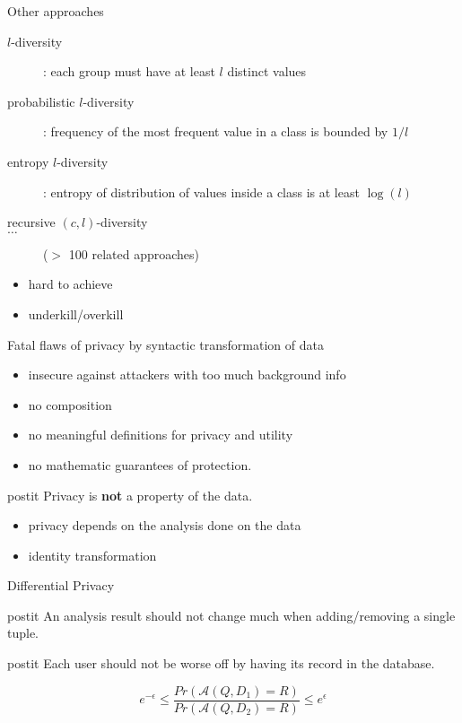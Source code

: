 \documentclass{beamer}
\begin{document}
\begin{frame}{Other approaches}
  \begin{description}
    \item[$l$-diversity]: each group must have at least $l$ distinct values
    \item[probabilistic $l$-diversity]: frequency of the most frequent value
      in a class is bounded by $1/l$
    \item[entropy $l$-diversity]: entropy of distribution of values inside a
      class is at least $\log(l)$
    \item[recursive $(c, l)$-diversity]
    \item[$\ldots$] ($>$ 100 related approaches)
  \end{description}
  \pause
  \begin{itemize}
    \item hard to achieve
    \item underkill/overkill
  \end{itemize}
\end{frame}

\begin{frame}{Fatal flaws of privacy by syntactic transformation of data}
  \begin{itemize}
    \item insecure against attackers with too much background info
    \item no composition
    \item no meaningful definitions for privacy and utility
    \item no mathematic guarantees of protection.
  \end{itemize}
  \pause
  \begin{beamercolorbox}[wd=\textwidth,rounded=true,shadow=true]{postit}
    Privacy is \textbf{not} a property of the data.
  \end{beamercolorbox}
  \begin{itemize}
    \item privacy depends on the analysis done on the data
    \item identity transformation
  \end{itemize}
\end{frame}

\begin{frame}{Differential Privacy}
  \begin{beamercolorbox}[wd=\textwidth,rounded=true,shadow=true]{postit}
    An analysis result should not change much when adding/removing a single
    tuple.
  \end{beamercolorbox}
  \pause
  \begin{beamercolorbox}[wd=\textwidth,rounded=true,shadow=true]{postit}
    Each user should not be worse off by having its record in the database.
  \end{beamercolorbox}
  \pause
  \begin{equation*}
    e^{-\epsilon} \le \frac{Pr(\mathcal{A}(Q, D_1) = R)}{Pr(\mathcal{A}(Q, D_2) = R)} \le e^{\epsilon}
  \end{equation*}
\end{frame}
\end{document}
